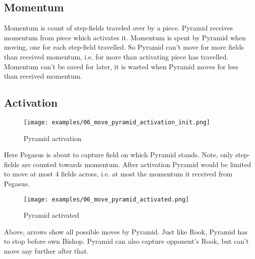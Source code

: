 \subsection*{Momentum}

Momentum is count of step-fields traveled over by a piece. Pyramid receives
momentum from piece which activates it. Momentum is spent by Pyramid when
moving, one for each step-field travelled. So Pyramid can't move for more
fields than received momentum, i.e. for more than activating piece has
travelled. Momentum can't be saved for later, it is wasted when Pyramid
moves for less than received momentum.

\clearpage %

\subsection*{Activation}

\noindent
\begin{figure}[!h]
\texttt{[image: examples/06\_move\_pyramid\_activation\_init.png]}
\caption{Pyramid activation}
\label{fig:ma_activation_init}
\end{figure}

Here Pegasus is about to capture field on which Pyramid stands. Note, only
step-fields are counted towards momentum. After activation Pyramid would be
limited to move at most 4 fields across, i.e. at most the momentum it received
from Pegasus.

\clearpage %

\noindent
\begin{figure}[!h]
\texttt{[image: examples/06\_move\_pyramid\_activated.png]}
\caption{Pyramid activated}
\label{fig:ma_activation_ongoing}
\end{figure}

Above, arrows show all possible moves by Pyramid. Just like Rook, Pyramid has to
stop before own Bishop. Pyramid can also capture opponent's Rook, but can't move
any further after that.

\clearpage %

